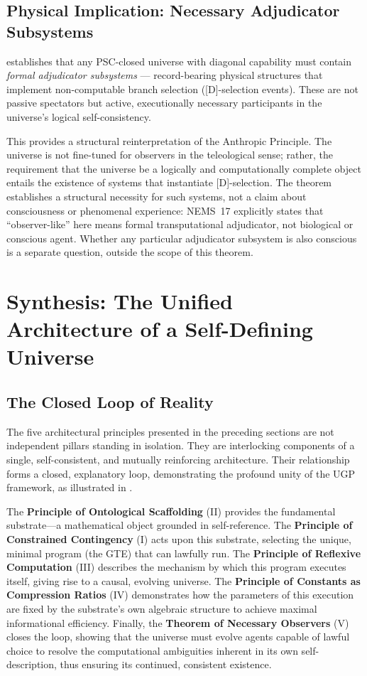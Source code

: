 \documentclass[12pt]{article}
\begin{document}
\subsection{Physical Implication: Necessary Adjudicator Subsystems}
 establishes that any PSC-closed universe with diagonal capability must contain \emph{formal adjudicator subsystems} --- record-bearing physical structures that implement non-computable branch selection ([D]-selection events). These are not passive spectators but active, executionally necessary participants in the universe's logical self-consistency.

This provides a structural reinterpretation of the Anthropic Principle. The universe is not fine-tuned for observers in the teleological sense; rather, the requirement that the universe be a logically and computationally complete object entails the existence of systems that instantiate [D]-selection. The theorem establishes a structural necessity for such systems, not a claim about consciousness or phenomenal experience: NEMS~17 explicitly states that ``observer-like'' here means formal transputational adjudicator, not biological or conscious agent. Whether any particular adjudicator subsystem is also conscious is a separate question, outside the scope of this theorem.

\section{Synthesis: The Unified Architecture of a Self-Defining Universe}
\label{sec:synthesis}

\subsection{The Closed Loop of Reality}
The five architectural principles presented in the preceding sections are not independent pillars standing in isolation. They are interlocking components of a single, self-consistent, and mutually reinforcing architecture. Their relationship forms a closed, explanatory loop, demonstrating the profound unity of the UGP framework, as illustrated in .

The \textbf{Principle of Ontological Scaffolding} (II) provides the fundamental substrate—a mathematical object grounded in self-reference. The \textbf{Principle of Constrained Contingency} (I) acts upon this substrate, selecting the unique, minimal program (the GTE) that can lawfully run. The \textbf{Principle of Reflexive Computation} (III) describes the mechanism by which this program executes itself, giving rise to a causal, evolving universe. The \textbf{Principle of Constants as Compression Ratios} (IV) demonstrates how the parameters of this execution are fixed by the substrate's own algebraic structure to achieve maximal informational efficiency. Finally, the \textbf{Theorem of Necessary Observers} (V) closes the loop, showing that the universe must evolve agents capable of lawful choice to resolve the computational ambiguities inherent in its own self-description, thus ensuring its continued, consistent existence.
\end{document}
